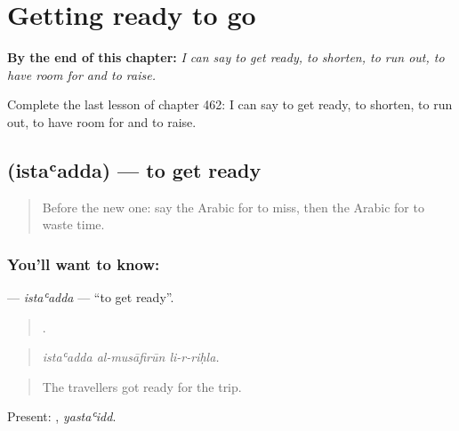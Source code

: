 
\chapter{Getting ready to go}
\label{ch:ar-getting-ready-to-go}

\begin{chapteropening}
\textbf{By the end of this chapter:} \emph{I can say to get ready, to shorten, to run out, to have room for and to raise.}

Complete the last lesson of chapter 462: I can say to get ready, to shorten, to run out, to have room for and to raise.
\end{chapteropening}

\section[\texorpdfstring{\ar{استعد} (istaʿadda)}{استعد (istaʿadda)}]{ (istaʿadda) — to get ready}

\label{lesson:AR-C462-istaadda}



\begin{quote}
Before the new one: say the Arabic for to miss, then the Arabic for to waste time.
\end{quote}

\subsection*{You'll want to know: }
\textbf{} — \emph{istaʿadda} — \textquotedblleft{}to get ready\textquotedblright{}.

\begin{quote}
  .
\end{quote}

\begin{quote}
\emph{istaʿadda al-musāfirūn li-r-riḥla.}
\end{quote}

\begin{quote}
The travellers got ready for the trip.
\end{quote}

Present: , \emph{yastaʿidd}.

